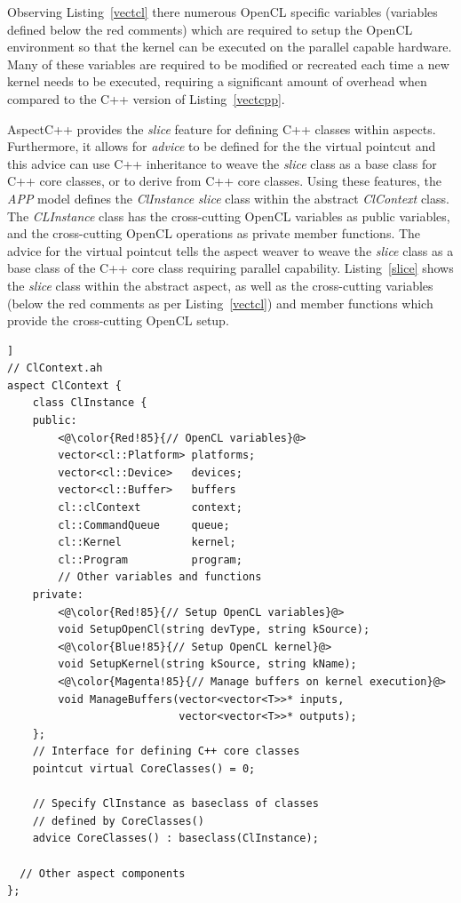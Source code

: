 \documentclass{sig-alternate-05-2015}
\begin{document}
Observing Listing~\ref{vectcl} there numerous OpenCL specific variables
(variables defined below the red comments) which are required to setup the 
OpenCL environment so that the kernel can be executed on the parallel capable 
hardware. Many of these variables are required to be modified or recreated each
time a new kernel needs to be executed, requiring a significant amount of 
overhead when compared to the C++ version of Listing~\ref{vectcpp}.

AspectC++ provides the \textit{slice} feature for defining C++ classes within
aspects. Furthermore, it allows for \textit{advice} to be defined for the
the virtual pointcut and this advice can use C++ inheritance to weave the
\textit{slice} class as a base class for C++ core classes, or to derive from 
C++ core classes. Using these features, the \textit{APP} model defines the 
\textit{ClInstance} \textit{slice} class within the abstract \textit{ClContext} class.  
The \textit{CLInstance} class has the cross-cutting OpenCL variables as public
variables, and the cross-cutting OpenCL operations as private member functions. 
The advice for the virtual pointcut tells the aspect weaver to weave the
\textit{slice} class as a base class of the C++ core class requiring parallel
capability. 
Listing~\ref{slice} shows the \textit{slice} class within the abstract aspect,
as well as the cross-cutting variables (below the red comments as per 
Listing~\ref{vectcl}) and member functions which provide the cross-cutting
OpenCL setup.

\begin{lstlisting}[caption=Abstract aspect which defined the OpenCL variables
required for parallel programming,label=slice,float=[!t]]
// ClContext.ah
aspect ClContext {
	class ClInstance {
	public:
		<@\color{Red!85}{// OpenCL variables}@>
		vector<cl::Platform> platforms;
		vector<cl::Device>   devices;
		vector<cl::Buffer>   buffers
		cl::clContext        context;
		cl::CommandQueue     queue;
		cl::Kernel           kernel;
		cl::Program          program;
		// Other variables and functions 
	private:
		<@\color{Red!85}{// Setup OpenCL variables}@>
		void SetupOpenCl(string devType, string kSource);
		<@\color{Blue!85}{// Setup OpenCL kernel}@>
		void SetupKernel(string kSource, string kName);
		<@\color{Magenta!85}{// Manage buffers on kernel execution}@>
		void ManageBuffers(vector<vector<T>>* inputs,
		                   vector<vector<T>>* outputs);
	};
	// Interface for defining C++ core classes
	pointcut virtual CoreClasses() = 0;

	// Specify ClInstance as baseclass of classes
	// defined by CoreClasses()
	advice CoreClasses() : baseclass(ClInstance);

  // Other aspect components
};
\end{lstlisting}
\end{document}
